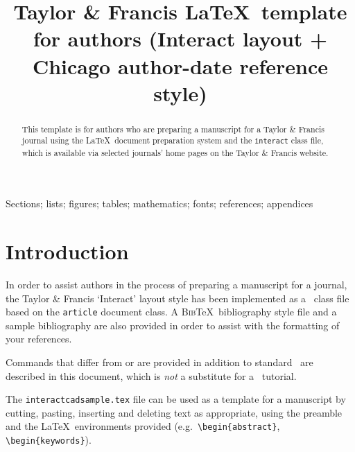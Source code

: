 \documentclass[]{interact}
\theoremstyle{plain}%
\theoremstyle{definition}
\theoremstyle{remark}
\begin{document}

\title{Taylor \& Francis \LaTeX\ template for authors (\textsf{Interact} layout + Chicago author-date reference style)}

\author{
}

\maketitle

\begin{abstract}
This template is for authors who are preparing a manuscript for a Taylor \& Francis journal using the \LaTeX\ document preparation system and the \texttt{interact} class file, which is available via selected journals' home pages on the Taylor \& Francis website.
\end{abstract}

\begin{keywords}
Sections; lists; figures; tables; mathematics; fonts; references; appendices
\end{keywords}


\section{Introduction}

In order to assist authors in the process of preparing a manuscript for a journal, the Taylor \& Francis `\textsf{Interact}' layout style has been implemented as a \LaTeXe\ class file based on the \texttt{article} document class. A \textsc{Bib}\TeX\ bibliography style file and a sample bibliography are also provided in order to assist with the formatting of your references.

Commands that differ from or are provided in addition to standard \LaTeXe\ are described in this document, which is \emph{not} a substitute for a \LaTeXe\ tutorial.

The \texttt{interactcadsample.tex} file can be used as a template for a manuscript by cutting, pasting, inserting and deleting text as appropriate, using the preamble and the \LaTeX\ environments provided (e.g.\ \verb"\begin{abstract}", \verb"\begin{keywords}").
\end{document}
